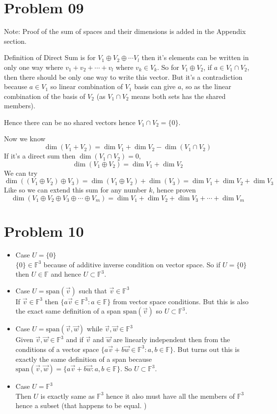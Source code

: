\documentclass[letter]{article}
\begin{document}
\section*{Problem 09}
Note: 
Proof of the sum of spaces and their dimensions is added in the Appendix section. 

Definition of Direct Sum is for $V_1 \oplus V_2 \oplus \cdots V_l$ then it's elements can be written in only one way where $v_1 + v_2 + \cdots + v_l$ where $v_k \in V_k$. So for $V_1 \oplus V_2$, if $a \in V_1 \cap V_2$, then there should be only one way to write this vector. But it's a contradiction because $a \in V_1$ so linear combination of $V_1$ basis can give $a$, so as the linear combination of the basis of $V_2$ (as $V_1 \cap V_2$ means both sets has the shared members). 

Hence there can be no shared vectors hence $V_1 \cap V_2 = \{0\} $. 

Now we know
\[
\dim (V_1 + V_2) = \dim V_1 + \dim V_2 - \dim(V_1 \cap  V_2)
\] 
If it's a direct sum then $\dim(V_1 \cap  V_2) = 0$, 
\[
\dim (V_1 \oplus V_2) = \dim V_1 + \dim V_2
\] 
We can try 
 \[
\dim ((V_1 \oplus V_2) \oplus V_3) = 
\dim(V_1 \oplus V_2) + \dim (V_3) =
\dim V_1 + \dim V_2 + \dim V_3
\]
Like so we can extend this sum for any number $k$, hence proven 
\[
\dim (V_1 \oplus V_2 \oplus V_3 \oplus \cdots \oplus V_m) = \dim V_1 + \dim V_2 + \dim V_3 + \cdots 
+ \dim V_m
\] 

\section*{Problem 10}
\begin{itemize}
	\item Case $U = \{0\} $\\ $\{0\} \in \mathbb{F}^{3}$ because of additive inverse condition on vector space. So if $U = \{0\} $ then $U \in \mathbb{F}$ and hence $U \subset \mathbb{F}^{3}$. 
	\item Case $U = \text{span}(\vec{v})$ such that $\vec{v} \in  \mathbb{F}^{3}$ \\
		If $\vec{v} \in \mathbb{F}^{3}$ then $\{a \vec{v} \in \mathbb{F}^{3} : a \in \mathbb{F}\} $ from vector space conditions. But this is also the exact same definition of a span $\text{span}(\vec{v})$ so $U \subset \mathbb{F}^{3}$.
	\item Case $U = \text{span}(\vec{v}, \vec{w})$ while $\vec{v}, \vec{w} \in \mathbb{F}^{3}$ \\
	Given $\vec{v}, \vec{w} \in  \mathbb{F}^{3}$ and if $\vec{v}$ and $\vec{w}$ are linearly independent then from the conditions of a vector space $\{a \vec{v} + b \vec{w} \in \mathbb{F}^{3}: a,b \in  \mathbb{F}\} $. But turns out this is exactly the same definition of a span because $\text{span}(\vec{v},\vec{w})= \{a \vec{v}+ b \vec{w} : a,b \in \mathbb{F}\} $.  So $U \subset \mathbb{F}^{3}$. 
\item Case $U = \mathbb{F}^{3}$ \\ 
	Then $U$ is exactly same as $\mathbb{F}^{3}$ hence it also must have all the members of $\mathbb{F}^{3}$ hence a subset (that happens to be equal. )
\end{itemize}
\end{document}
